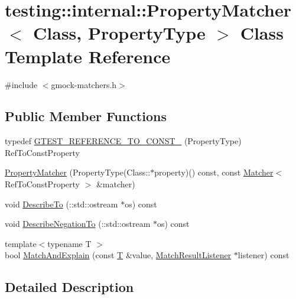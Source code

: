 \hypertarget{classtesting_1_1internal_1_1_property_matcher}{}\section{testing\+:\+:internal\+:\+:Property\+Matcher$<$ Class, Property\+Type $>$ Class Template Reference}
\label{classtesting_1_1internal_1_1_property_matcher}


{\ttfamily \#include $<$gmock-\/matchers.\+h$>$}

\subsection*{Public Member Functions}
\begin{DoxyCompactItemize}
\item 
typedef \hyperlink{classtesting_1_1internal_1_1_property_matcher_aa2a26b33473de3ca6953cae490e373ec}{G\+T\+E\+S\+T\+\_\+\+R\+E\+F\+E\+R\+E\+N\+C\+E\+\_\+\+T\+O\+\_\+\+C\+O\+N\+S\+T\+\_\+} (Property\+Type) Ref\+To\+Const\+Property
\item 
\hyperlink{classtesting_1_1internal_1_1_property_matcher_a9b658d58f5c58d02949bb81f7e6b46ce}{Property\+Matcher} (Property\+Type(Class\+::$\ast$property)() const, const \hyperlink{classtesting_1_1_matcher}{Matcher}$<$ Ref\+To\+Const\+Property $>$ \&matcher)
\item 
void \hyperlink{classtesting_1_1internal_1_1_property_matcher_ae7c21ff16ee1e6131b9d5e7521d31483}{Describe\+To} (\+::std\+::ostream $\ast$os) const 
\item 
void \hyperlink{classtesting_1_1internal_1_1_property_matcher_af8cdceeab02245da7ba602a2a2c8c820}{Describe\+Negation\+To} (\+::std\+::ostream $\ast$os) const 
\item 
{\footnotesize template$<$typename T $>$ }\\bool \hyperlink{classtesting_1_1internal_1_1_property_matcher_ac3d365400a10aaee763d5408f8ad6089}{Match\+And\+Explain} (const \hyperlink{functions__7_8js_adf1f3edb9115acb0a1e04209b7a9937b}{T} \&value, \hyperlink{classtesting_1_1_match_result_listener}{Match\+Result\+Listener} $\ast$listener) const 
\end{DoxyCompactItemize}


\subsection{Detailed Description}
